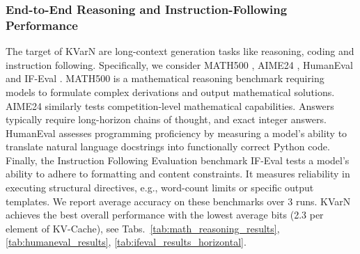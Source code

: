 \documentclass{article}
\newcommand{\methodname}{KVarN\xspace}
\begin{document}
\subsubsection{End-to-End Reasoning and Instruction-Following Performance}
The target of \methodname are long-context generation tasks like reasoning, coding and instruction following. Specifically, we consider MATH500 \cite{lightman2024lets_math500}, AIME24 \cite{aime24}, HumanEval \cite{chen2021evaluating_humaneval} and IF-Eval \cite{zhou2023instructionfollowingevaluationlargelanguage_ifeval}. MATH500 is a mathematical reasoning benchmark requiring models to formulate complex derivations and output mathematical solutions.  AIME24 similarly tests competition-level mathematical capabilities. Answers typically require long-horizon chains of thought, and exact integer answers. HumanEval assesses programming proficiency by measuring a model's ability to translate natural language docstrings into functionally correct Python code. Finally, the Instruction Following Evaluation benchmark IF-Eval tests a model's ability to  adhere to formatting and content constraints. It measures reliability in executing structural directives, e.g., word-count limits or specific output templates. We report average accuracy on these benchmarks over 3 runs. \methodname achieves the best overall performance with the lowest average bits (2.3 per element of KV-Cache), see Tabs.~\ref{tab:math_reasoning_results}, \ref{tab:humaneval_results}, \ref{tab:ifeval_results_horizontal}.









\end{document}
